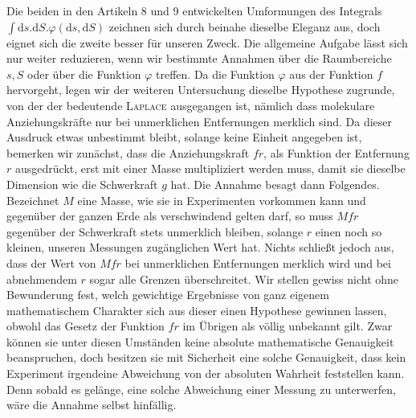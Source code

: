 Die beiden in den Artikeln 8 und 9 entwickelten Umformungen des Integrals $\int\mathrm{d}s.\mathrm{d}S.\varphi(\mathrm{d}s,\mathrm{d}S)$ zeichnen sich durch beinahe dieselbe Eleganz aus, doch eignet sich die zweite besser für unseren Zweck. Die allgemeine Aufgabe lässt sich nur weiter reduzieren, wenn wir bestimmte Annahmen über die Raumbereiche $s,S$ oder über die Funktion $\varphi$ treffen. Da die Funktion $\varphi$ aus der Funktion $f$ hervorgeht, legen wir der weiteren Untersuchung dieselbe Hypothese zugrunde, von der der bedeutende \textsc{Laplace} ausgegangen ist, nämlich dass molekulare Anziehungskräfte nur bei unmerklichen Entfernungen merklich sind. Da dieser Ausdruck etwas unbestimmt bleibt, solange keine Einheit angegeben ist, bemerken wir zunächst, dass die Anziehungskraft $fr$, als Funktion der Entfernung $r$ ausgedrückt, erst mit einer Masse multipliziert werden muss, damit sie dieselbe Dimension wie die Schwerkraft $g$ hat. Die Annahme besagt dann Folgendes. Bezeichnet $M$ eine Masse, wie sie in Experimenten vorkommen kann und gegenüber der ganzen Erde als verschwindend gelten darf, so muss $Mfr$ gegenüber der Schwerkraft stets unmerklich bleiben, solange $r$ einen noch so kleinen, unseren Messungen zugänglichen Wert hat. Nichts schließt jedoch aus, dass der Wert von $Mfr$ bei unmerklichen Entfernungen merklich wird und bei abnehmendem $r$ sogar alle Grenzen überschreitet. Wir stellen gewiss nicht ohne Bewunderung fest, welch gewichtige Ergebnisse von ganz eigenem mathematischem Charakter sich aus dieser einen Hypothese gewinnen lassen, obwohl das Gesetz der Funktion $fr$ im Übrigen als völlig unbekannt gilt. Zwar können sie unter diesen Umständen keine absolute mathematische Genauigkeit beanspruchen, doch besitzen sie mit Sicherheit eine solche Genauigkeit, dass kein Experiment irgendeine Abweichung von der absoluten Wahrheit feststellen kann. Denn sobald es gelänge, eine solche Abweichung einer Messung zu unterwerfen, wäre die Annahme selbst hinfällig.

